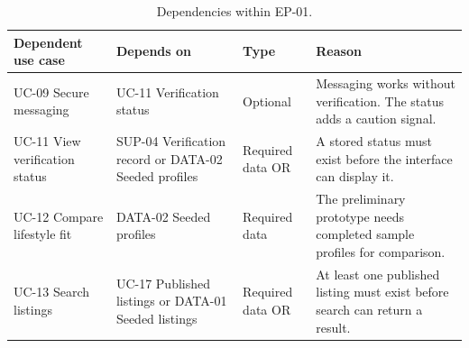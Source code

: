 \documentclass[11pt,a4paper]{article}
\begin{document}
\begin{table}[H]
    \centering
    \small
    \caption{Dependencies within EP-01.}
    \begin{tabularx}{\textwidth}{@{}L{2.9cm}L{3.3cm}L{2.1cm}Y@{}}
        \toprule
        Dependent use case & Depends on & Type & Reason\\
        \midrule
        UC-09 Secure messaging & UC-11 Verification status & Optional & Messaging works without verification. The status adds a caution signal.\\
        UC-11 View verification status & SUP-04 Verification record or DATA-02 Seeded profiles & Required data OR & A stored status must exist before the interface can display it.\\
        UC-12 Compare lifestyle fit & DATA-02 Seeded profiles & Required data & The preliminary prototype needs completed sample profiles for comparison.\\
        UC-13 Search listings & UC-17 Published listings or DATA-01 Seeded listings & Required data OR & At least one published listing must exist before search can return a result.\\
        \bottomrule
    \end{tabularx}
    \label{tabdepsdiscovery}
\end{table}
\end{document}
